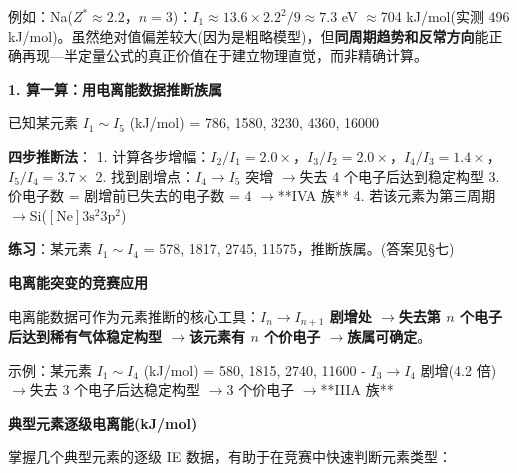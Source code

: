 \documentclass[a4paper,11pt]{ctexart}
\newcommand{\箭}{\ensuremath{\rightarrow}}
\newcommand{\左箭}{\ensuremath{\leftarrow}}
\newcommand{\上箭}{\ensuremath{\uparrow}}
\newcommand{\下箭}{\ensuremath{\downarrow}}
\newcommand{\衡}{\ensuremath{\rightleftharpoons}}
\newcommand{\双箭}{\ensuremath{\leftrightarrow}}
\newcommand{\约等于}{\ensuremath{\approx}}
\newcommand{\小于等于}{\ensuremath{\leq}}
\newcommand{\大于等于}{\ensuremath{\geq}}
\newcommand{\不等于}{\ensuremath{\neq}}
\newcommand{\西格马}{\ensuremath{\sigma}}
\newcommand{\派}{\ensuremath{\pi}}
\begin{document}
例如：Na(\(Z^*\approx2.2\)，\(n=3\))：\(I_1 \approx 13.6 \times 2.2^2/9 \approx 7.3\) eV \约等于 704 kJ/mol(实测 496 kJ/mol)。虽然绝对值偏差较大(因为是粗略模型)，但\textbf{同周期趋势和反常方向}能正确再现---半定量公式的真正价值在于建立物理直觉，而非精确计算。

\textbf{1. 算一算：用电离能数据推断族属}

已知某元素 \(I_1\sim I_5\) (kJ/mol) = 786, 1580, 3230, 4360, 16000

\textbf{四步推断法}：
1. 计算各步增幅：\(I_2/I_1=2.0\times\)，\(I_3/I_2=2.0\times\)，\(I_4/I_3=1.4\times\)，\(I_5/I_4=3.7\times\)
2. 找到剧增点：\(I_4\to I_5\) 突增 \箭 失去 4 个电子后达到稳定构型
3. 价电子数 = 剧增前已失去的电子数 = 4 \箭 **IVA 族**
4. 若该元素为第三周期 \箭 Si(\([\mathrm{Ne}]3\mathrm{s}^2 3\mathrm{p}^2\))

\textbf{练习}：某元素 \(I_1\sim I_4\) = 578, 1817, 2745, 11575，推断族属。(答案见§七)

\textbf{电离能突变的竞赛应用}

电离能数据可作为元素推断的核心工具：\textbf{\(I_n \to I_{n+1}\) 剧增处 \箭 失去第 \(n\) 个电子后达到稀有气体稳定构型 \箭 该元素有 \(n\) 个价电子 \箭 族属可确定}。

示例：某元素 \(I_1\sim I_4\) (kJ/mol) = 580, 1815, 2740, 11600
- \(I_3\to I_4\) 剧增(4.2 倍)\箭 失去 3 个电子后达稳定构型 \箭 3 个价电子 \箭 **IIIA 族**

\textbf{典型元素逐级电离能(kJ/mol)}

掌握几个典型元素的逐级 IE 数据，有助于在竞赛中快速判断元素类型：
\end{document}
